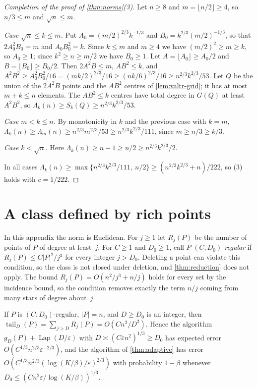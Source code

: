 \documentclass[anonymous,a4paper,USenglish,cleveref,autoref,thm-restate]{socg-lipics-v2021}
\newcommand{\eps}{\varepsilon}
\newcommand{\Lam}{\Lambda}
\newcommand{\tail}{\operatorname{tail}}
\newcommand{\Lap}{\operatorname{Lap}}
\begin{document}
\begin{proof}[Completion of the proof of \cref{thm:norms}(3)]
Let $n\ge8$ and $m=\lfloor n/2\rfloor\ge4$, so $n/3\le m$ and $\sqrt n\le m$.

\emph{Case $\sqrt n\le k\le m$.} Put $A_0=(m/2)^{2/3}k^{-1/3}$ and $B_0=k^{2/3}(m/2)^{-1/3}$, so that $2A_0^2B_0=m$ and $A_0B_0^2=k$. Since $k\le m$ and $m\ge4$ we have $(m/2)^2\ge m\ge k$, so $A_0\ge1$; since $k^2\ge n\ge m/2$ we have $B_0\ge1$. Let $A=\lfloor A_0\rfloor\ge A_0/2$ and $B=\lfloor B_0\rfloor\ge B_0/2$. Then $2A^2B\le m$, $AB^2\le k$, and $A^2B^2\ge A_0^2B_0^2/16=(mk/2)^{2/3}/16\ge(nk/6)^{2/3}/16\ge n^{2/3}k^{2/3}/53$. Let $Q$ be the union of the $2A^2B$ points and the $AB^2$ centres of \cref{lem:valtr-grid}; it has at most $m+k\le n$ elements. The $AB^2\le k$ centres have total degree in $G(Q)$ at least $A^2B^2$, so $\Lam_k(n)\ge S_k(Q)\ge n^{2/3}k^{2/3}/53$.

\emph{Case $m<k\le n$.} By monotonicity in $k$ and the previous case with $k=m$, $\Lam_k(n)\ge\Lam_m(n)\ge n^{2/3}m^{2/3}/53\ge n^{2/3}k^{2/3}/111$, since $m\ge n/3\ge k/3$.

\emph{Case $k<\sqrt n$.} Here $\Lam_k(n)\ge n-1\ge n/2\ge n^{2/3}k^{2/3}/2$.

In all cases $\Lam_k(n)\ge\max\{n^{2/3}k^{2/3}/111,\ n/2\}\ge(n^{2/3}k^{2/3}+n)/222$, so (3) holds with $c=1/222$.
\end{proof}

\section{A class defined by rich points}
\label{app:promise}

In this appendix the norm is Euclidean. For $j\ge1$ let $R_j(P)$ be the number of points of $P$ of degree at least~$j$. For $C\ge1$ and $D_0\ge1$, call $P$ \emph{$(C,D_0)$-regular} if $R_j(P)\le C|P|^2/j^3$ for every integer $j>D_0$. Deleting a point can violate this condition, so the class is not closed under deletion, and \cref{thm:reduction} does not apply. The bound $R_j(P)=O(n^2/j^3+n/j)$ holds for every set by the incidence bound, so the condition removes exactly the term $n/j$ coming from many stars of degree about~$j$.

\begin{proposition}
\label{prop:promise-upper}
If $P$ is $(C,D_0)$-regular, $|P|=n$, and $D\ge D_0$ is an integer, then $\tail_D(P)=\sum_{j>D}R_j(P)=O(Cn^2/D^2)$. Hence the algorithm $g_D(P)+\Lap(D/\eps)$ with $D\asymp(C\eps n^2)^{1/3}\ge D_0$ has expected error $O(C^{1/3}n^{2/3}\eps^{-2/3})$, and the algorithm of \cref{thm:adaptive} has error $O(C^{1/3}n^{2/3}(\log(K/\beta)/\eps)^{2/3})$ with probability $1-\beta$ whenever $D_0\le(Cn^2\eps/\log(K/\beta))^{1/3}$.
\end{proposition}
\end{document}
